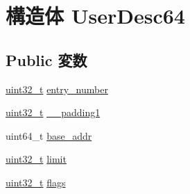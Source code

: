 \hypertarget{structUserDesc64}{
\section{構造体 UserDesc64}
\label{structUserDesc64}
}
\subsection*{Public 変数}
\begin{DoxyCompactItemize}
\item 
\hyperlink{Type_8hh_a435d1572bf3f880d55459d9805097f62}{uint32\_\-t} \hyperlink{structUserDesc64_a3853054eadcbb69cc9c8f72b529d672c}{entry\_\-number}
\item 
\hyperlink{Type_8hh_a435d1572bf3f880d55459d9805097f62}{uint32\_\-t} \hyperlink{structUserDesc64_a136aaa05f51583820b3ea29067462b5d}{\_\-\_\-padding1}
\item 
uint64\_\-t \hyperlink{structUserDesc64_a01f23b98a91aec01909d35c79b36ace7}{base\_\-addr}
\item 
\hyperlink{Type_8hh_a435d1572bf3f880d55459d9805097f62}{uint32\_\-t} \hyperlink{structUserDesc64_a119a08b6fc41ba2bd00760569f3167eb}{limit}
\item 
\hyperlink{Type_8hh_a435d1572bf3f880d55459d9805097f62}{uint32\_\-t} \hyperlink{structUserDesc64_a773b39d480759f67926cb18ae2219281}{flags}
\end{DoxyCompactItemize}


